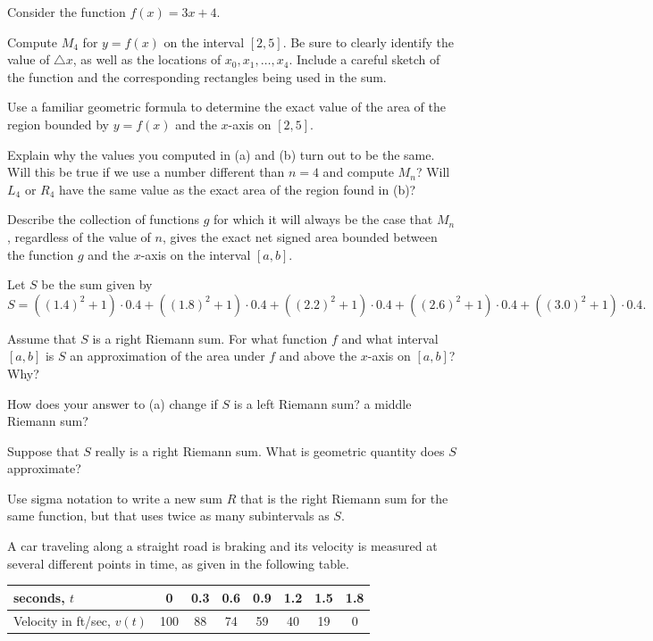 \begin{exercises} 
  \item Consider the function $f(x) = 3x + 4$.
  \ba
  	\item Compute $M_4$ for $y=f(x)$ on the interval $[2,5]$.  Be sure to clearly identify the value of $\triangle x$, as well as the locations of $x_0, x_1, \ldots, x_4$.  Include a careful sketch of the function and the corresponding rectangles being used in the sum.
	\item Use a familiar geometric formula to determine the exact value of the area of the region bounded by $y = f(x)$ and the $x$-axis on $[2,5]$.
	\item Explain why the values you computed in (a) and (b) turn out to be the same.  Will this be true if we use a number different than $n = 4$ and compute $M_n$?  Will $L_4$ or $R_4$ have the same value as the exact area of the region found in (b)?
	\item Describe the collection of functions $g$ for which it will always be the case that $M_n$, regardless of the value of $n$, gives the exact net signed area bounded between the function $g$ and the $x$-axis on the interval $[a,b]$.
  \ea	
  \item Let $S$ be the sum given by
  $$S = ((1.4)^2 + 1) \cdot 0.4 + ((1.8)^2 + 1) \cdot 0.4 + ((2.2)^2 + 1) \cdot 0.4 + ((2.6)^2 + 1) \cdot 0.4 +((3.0)^2 + 1) \cdot 0.4.$$
  	\ba
		\item Assume that $S$ is a right Riemann sum.  For what function $f$ and what interval $[a,b]$ is $S$ an approximation of the area under $f$ and above the $x$-axis on $[a,b]$?  Why?
		\item How does your answer to (a) change if $S$ is a left Riemann sum?  a middle Riemann sum?
		\item Suppose that $S$ really is a right Riemann sum.  What is geometric quantity does $S$ approximate?
		\item Use sigma notation to write a new sum $R$ that is the right Riemann sum for the same function, but that uses twice as many subintervals as $S$.
	\ea
	\item A car traveling along a straight road is braking and its velocity is measured at several different points in time, as given in the following table.
\begin{center}
\begin{tabular}{|l|c|c|c|c|c|c|c|}
\hline
seconds, $t$ & 0 & 0.3 & 0.6 & 0.9 & 1.2 & 1.5 & 1.8 \\
\hline
Velocity in ft/sec, $v(t)$ & 100 & 88 & 74 & 59 & 40 & 19 & 0 \\

\end{tabular}
\end{center}
\end{exercises}
